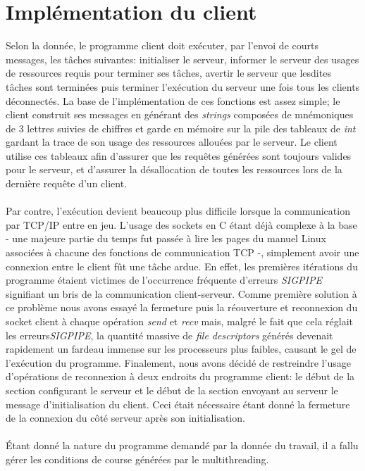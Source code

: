\documentclass[11pt]{article}
\begin{document}
\section*{ Implémentation du client }
\setlength{\parindent}{20pt}
Selon la donnée, le programme client doit exécuter, par l'envoi de courts messages, les tâches suivantes: initialiser le serveur, informer le 
serveur des usages de ressources requis pour terminer ses tâches, avertir le serveur que lesdites tâches sont terminées puis terminer 
l'exécution du serveur une fois tous les clients déconnectés. La base de l'implémentation de ces fonctions est assez simple; le client construit 
ses messages en générant des \emph{strings} composées de mnémoniques de 3 lettres suivies de chiffres et garde en mémoire sur la pile des 
tableaux de \emph{int} gardant la trace de son usage des ressources allouées par le serveur. Le client utilise ces tableaux afin d'assurer 
que les requêtes générées sont toujours valides pour le serveur, et d’assurer la désallocation de toutes les ressources lors de la dernière 
requête d’un client.\\
\\
Par contre, l'exécution devient beaucoup plus difficile lorsque la communication par TCP/IP entre en jeu. L'usage des sockets en C étant déjà 
complexe à la base - une majeure partie du temps fut passée à lire les pages du manuel Linux associées à chacune des fonctions de 
communication TCP -, simplement avoir une connexion entre le client fût une tâche ardue. En effet, les premières itérations du programme étaient 
victimes de l'occurrence fréquente d'erreurs \emph{SIGPIPE} signifiant un bris de la communication client-serveur. Comme première solution à ce 
problème nous avons essayé la fermeture puis la réouverture et reconnexion du socket client à chaque opération \emph{send} et \emph{recv} mais, 
malgré le fait que cela réglait les erreurs\emph{SIGPIPE}, la quantité massive de \emph{file descriptors} générés devenait rapidement un fardeau 
immense sur les processeurs plus faibles, causant le gel de l'exécution du programme. Finalement, nous avons décidé de restreindre l'usage 
d'opérations de reconnexion à deux endroits du programme client: le début de la section configurant le serveur et le début de la section 
envoyant au serveur le message d'initialisation du client. Ceci était nécessaire étant donné la fermeture de la connexion du côté serveur après 
son initialisation.\\
\\
Étant donné la nature du programme demandé par la donnée du travail, il a fallu gérer les conditions de course générées par le multithreading. 
\end{document}
